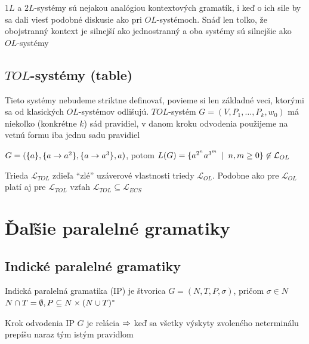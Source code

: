 \begin{poznamka}
    $1L$ a $2L$-systémy sú nejakou analógiou kontextových gramatík, i
    keď o ich sile by sa dali viesť podobné diskusie ako pri
    $OL$-systémoch. Snáď len toľko, že obojstranný kontext je silnejší
    ako jednostranný a oba systémy sú silnejšie ako $OL$-systémy
\end{poznamka}

\subsection{$TOL$-systémy (table)}

Tieto systémy nebudeme striktne definovať, povieme si len základné
veci, ktorými sa od kla\-sic\-kých $OL$-systémov odlišujú.
$TOL$-systém $G=(V,P_{1},\dots,P_{k},w_{0})$ má niekoľko
(konkrétne $k$) sád pravidiel, v danom kroku odvodenia použijeme
na vetnú formu iba jednu sadu pravidiel

\begin{priklad}
    $G=(\{a\},\{a\rightarrow a^{2}\},\{a\rightarrow a^{3}\},a)$, potom
    $L(G)=\{a^{2^{n}}a^{3^{m}}\enspace |\enspace n,m\geq0\}\not\in\mathcal{L}_{OL}$
\end{priklad}

\begin{poznamka}
    Trieda $\mathcal{L}_{TOL}$ zdieľa ``zlé'' uzáverové vlastnosti
    triedy $\mathcal{L}_{OL}$. Podobne ako pre $\mathcal{L}_{OL}$
    platí aj pre $\mathcal{L}_{TOL}$ vzťah
    $\mathcal{L}_{TOL}\subseteq\mathcal{L}_{ECS}$
\end{poznamka}

\section{Ďaľšie paralelné gramatiky}

\subsection{Indické paralelné gramatiky}

\begin{definicia}
    Indická paralelná gramatika (IP) je štvorica $G=(N,T,P,\sigma)$,
    pričom \mbox{$\sigma\in N$} $N\cap T=\emptyset, P\subseteq
    N\times(N\cup T)^{*}$
\end{definicia}

\begin{definicia}
    Krok odvodenia IP $G$ je relácia $\Rightarrow$ keď sa všetky výskyty
    zvoleného neterminálu prepíšu naraz tým istým pravidlom
\end{definicia}

